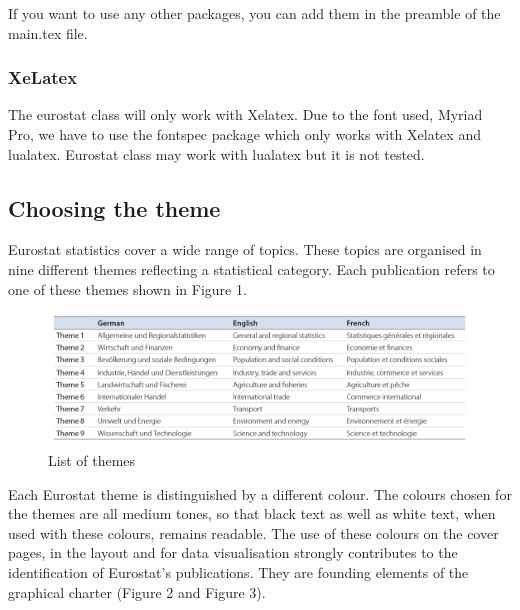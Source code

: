 \documentclass[Theme1]{{template_material/eurostat}}
\begin{document}
If you want to use any other packages, you can add them in the preamble of the main.tex file. 

\newpage
\subsubsection{XeLatex}

The eurostat class will only work with Xelatex. Due to the font used, Myriad Pro, we have to use the fontspec package which only works with Xelatex and lualatex. Eurostat class may work with lualatex but it is not tested. 

\subsection{Choosing the theme}

Eurostat statistics cover a wide range of topics. These topics are organised in nine different themes reflecting a statistical category. Each publication refers to one of these themes shown in Figure 1. 

\begin{figure}[h]
    \caption{List of themes} %
    \label{fig:listofthemes}
    \includegraphics[width=1\textwidth]{template_material/FiguresFiles/List of themes.PNG}
\end{figure}

Each Eurostat theme is distinguished by a different colour.  The colours chosen for the themes are all medium tones, so that black text as well as white text, when used with these colours, remains readable.
The use of these colours on the cover pages, in the layout and for data visualisation strongly contributes to the identification of Eurostat’s publications. They are founding elements of the graphical charter (Figure 2 and Figure 3).
\end{document}
